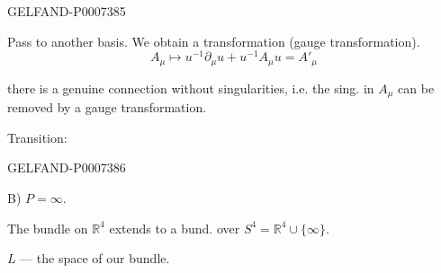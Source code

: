 \begin{GelfandAdjacentEvidence}{GELFAND-P000738}{5}


Pass to another basis. We obtain a transformation (gauge transformation).
\begin{equation*}
\tag*{(4)\hfill}
A_\mu\mapsto u^{-1}\partial_\mu u+u^{-1}A_\mu u=A'_\mu
\end{equation*}

 there is a genuine connection without singularities, i.e. the sing. in \(A_\mu\) can be removed by a gauge transformation.

Transition:
\end{GelfandAdjacentEvidence}
\begin{GelfandAdjacentEvidence}{GELFAND-P000738}{6}


B)  \(P=\infty\).

The bundle on
\(\mathbb R^4\) extends to a bund. over \(S^4=\mathbb R^4\cup\{\infty\}\).
\end{GelfandAdjacentEvidence}

\(L\) --- the space of our bundle.


